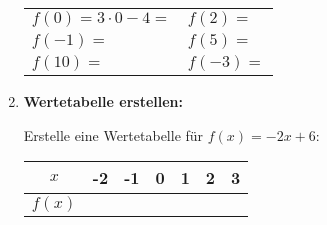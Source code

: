 \begin{enumerate}[label=\arabic*.]
    \begin{tabular}{ll}
        $f(0) = 3 \cdot 0 - 4 = $ \underline{\hspace{2cm}} & $f(2) = $ \underline{\hspace{4cm}} \\[1.5ex]
        $f(-1) = $ \underline{\hspace{4cm}} & $f(5) = $ \underline{\hspace{4cm}} \\[1.5ex]
        $f(10) = $ \underline{\hspace{4cm}} & $f(-3) = $ \underline{\hspace{4cm}}
    \end{tabular}

    \vspace{1cm}

    \item \textbf{Wertetabelle erstellen:}

    Erstelle eine Wertetabelle für $f(x) = -2x + 6$:

    \begin{center}
        \begin{tabular}{|c|c|c|c|c|c|c|}
            \hline
            $x$ & -2 & -1 & 0 & 1 & 2 & 3 \\
            \hline
            $f(x)$ & & & & & & \\
            \hline
        \end{tabular}
    \end{center}

\end{enumerate}
